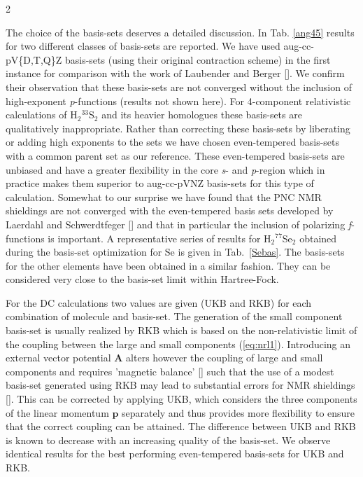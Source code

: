 \documentclass[a4paper,12pt,english]{article}
\begin{document}
\begin{spacing}{2}
\par The choice of the basis-sets deserves a detailed discussion. In Tab. \ref{ang45} results for two different classes of basis-sets are reported. We have used aug-cc-pV\{D,T,Q\}Z basis-sets (using their original contraction scheme) in the first instance for comparison with the work of Laubender and Berger [\cite{berger2003chemphyschem}]. We confirm their observation that these basis-sets are not converged without the inclusion of high-exponent \emph{p}-functions (results not shown here). For 4-component relativistic calculations of H$_2{^{33}}$S$_2$ and its heavier homologues these basis-sets are qualitatively inappropriate. Rather than correcting these basis-sets by liberating or adding high exponents to the sets we have chosen even-tempered basis-sets with a common parent set as our reference. These even-tempered basis-sets are unbiased and have a greater flexibility in the core \emph{s}- and \emph{p}-region which in practice makes them superior to aug-cc-pVNZ basis-sets for this type of calculation. Somewhat to our surprise we have found that the PNC NMR shieldings are not converged with the even-tempered basis sets developed by Laerdahl and Schwerdtfeger [\cite{peter1999physreva}] and that in particular the inclusion of polarizing \emph{f}-functions is important. A representative series of results for H$_2{^{77}}$Se$_2$ obtained during the basis-set optimization for Se is given in \mbox{Tab. \ref{Sebas}}. The basis-sets for the other elements have been obtained in a similar fashion. They can be considered very close to the basis-set limit within Hartree-Fock. 
\par For the DC calculations two values are given (UKB and RKB) for each combination of molecule and basis-set. The generation of the small component basis-set is usually realized by RKB which is based on the non-relativistic limit of the coupling between the large and small components (\ref{eq:nrl1}). Introducing an external vector potential $\mathbf{A}$ alters however the coupling of large and small components and requires 'magnetic balance' [\cite{aucar1999jchemphys}] such that the use of a modest basis-set generated using RKB may lead to substantial errors for NMR shieldings [\cite{saue2004jchemphys}]. This can be corrected by applying UKB, which considers the three components of the linear momentum $\mathbf{p}$ separately and thus provides more flexibility to ensure that the correct coupling can be attained. The difference between UKB and RKB is known to decrease with an increasing quality of the basis-set. We observe identical results for the best performing even-tempered basis-sets for UKB and RKB.


\end{spacing}
\end{document}
